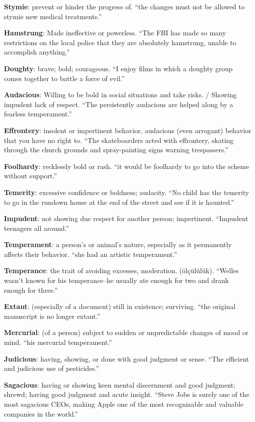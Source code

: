 \documentclass[12pt, a4paper]{ximera}
\begin{document}
\textbf{Stymie}: prevent or hinder the progress of. ``the changes must not be allowed to stymie new medical treatments.''

\textbf{Hamstrung}: Made ineffective or powerless. ``The FBI has made so many restrictions on the local police that they are absolutely hamstrung, unable to accomplish anything.''

\textbf{Doughty}: brave; bold; courageous. ``I enjoy films in which a doughty group comes together to battle a force of evil.''

\textbf{Audacious}: Willing to be bold in social situations and take risks. / Showing impudent lack of respect.  ``The persistently audacious are helped along by a fearless temperament.''

\textbf{Effrontery}: insolent or impertinent behavior, audacious (even arrogant) behavior that you have no right to. ``The skateboarders acted with effrontery, skating through the church grounds and spray-painting signs warning trespassers.''

\textbf{Foolhardy}: recklessly bold or rash. ``it would be foolhardy to go into the scheme without support.''

\textbf{Temerity}: excessive confidence or boldness; audacity. ``No child has the temerity to go in the rundown house at the end of the street and see if it is haunted.''

\textbf{Impudent}: not showing due respect for another person; impertinent. ``Impudent teenagers all around.''

\textbf{Temperament}: a person's or animal's nature, especially as it permanently affects their behavior. ``she had an artistic temperament.''

\textbf{Temperance}: the trait of avoiding excesses, moderation. (ölçülülük). ``Welles wasn't known for his temperance--he usually ate enough for two and drank enough for three.''

\textbf{Extant}: (especially of a document) still in existence; surviving. ``the original manuscript is no longer extant.''

\textbf{Mercurial}: (of a person) subject to sudden or unpredictable changes of mood or mind. ``his mercurial temperament.''

\textbf{Judicious}: having, showing, or done with good judgment or sense. ``The efficient and judicious use of pesticides.''

\textbf{Sagacious}: having or showing keen mental discernment and good judgment; shrewd; having good judgment and acute insight. ``Steve Jobs is surely one of the most sagacious CEOs, making Apple one of the most recognizable and valuable companies in the world.''
\end{document}

